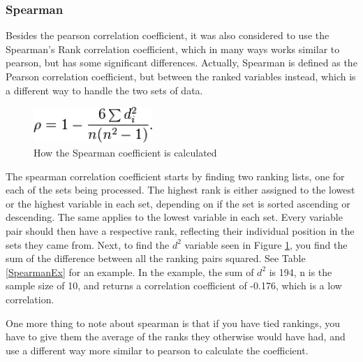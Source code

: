 \subsubsection{Spearman}

Besides the pearson correlation coefficient, it was also considered to use the Spearman’s Rank correlation coefficient, which in many ways works similar to pearson, but has some significant differences. Actually, Spearman is defined as the Pearson correlation coefficient, but between the ranked variables instead, which is a different way to handle the two sets of data. \cite{Spearman2}

\begin{figure}[htb]
\centering
\includegraphics[width=0.4\textwidth]{Images/SpearmanCalc.png}
\caption{How the Spearman coefficient is calculated}
\label{SpearCalc}
\end{figure}

The spearman correlation coefficient starts by finding two ranking lists, one for each of the sets being processed. The highest rank is either assigned to the lowest or the highest variable in each set, depending on if the set is sorted ascending or descending. The same applies to the lowest variable in each set. Every variable pair should then have a respective rank, reflecting their individual position in the sets they came from. Next, to find the $d^2$ variable seen in Figure \ref{SpearCalc}, you find the sum of the difference between all the ranking pairs squared. See Table \ref{SpearmanEx} for an example. In the example, the sum of $d^2$ is 194, n is the sample size of 10, and returns a correlation coefficient of -0.176, which is a low correlation. \cite{Spearman2}

One more thing to note about spearman is that if you have tied rankings, you have to give them the average of the ranks they otherwise would have had, and use a different way more similar to pearson to calculate the coefficient. \cite{Spearman1}

